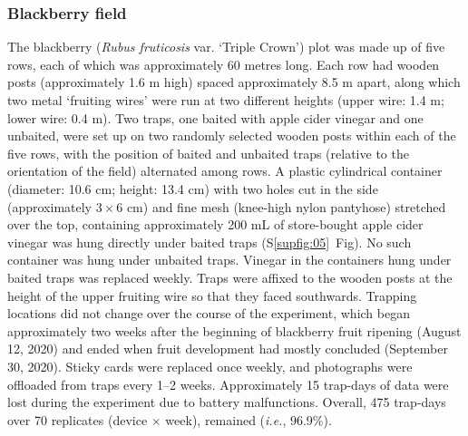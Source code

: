 \documentclass[12pt]{article}
\begin{document}
\begin{linenumbers}
		\subsubsection*{Blackberry field}
		The blackberry (\emph{Rubus fruticosis} var. ‘Triple Crown’) plot was made up of five rows, each of which was approximately 60 metres long. Each row had wooden posts (approximately 1.6 m high) spaced approximately 8.5 m apart, along which two metal ‘fruiting wires’ were run at two different heights (upper wire: 1.4 m; lower wire: 0.4 m). Two traps, one baited with apple cider vinegar and one unbaited, were set up on two randomly selected wooden posts within each of the five rows, with the position of baited and unbaited traps (relative to the orientation of the field) alternated among rows. A plastic cylindrical container (diameter: 10.6 cm; height: 13.4 cm) with two holes cut in the side (approximately $3 \times{} 6$ cm) and fine mesh (knee-high nylon pantyhose) stretched over the top, containing approximately 200 mL of store-bought apple cider vinegar was hung directly under baited traps
		(S\ref{supfig:05}~Fig). No such container was hung under unbaited traps. Vinegar in the containers hung under baited traps was replaced weekly. Traps were affixed to the wooden posts at the height of the upper fruiting wire so that they faced southwards. Trapping locations did not change over the course of the experiment, which began approximately two weeks after the beginning of blackberry fruit ripening (August 12, 2020) and ended when fruit development had mostly concluded (September 30, 2020). Sticky cards were replaced once weekly, and photographs were offloaded from traps every 1–2 weeks. Approximately 15 trap-days of data were lost during the experiment due to battery malfunctions. Overall, 475 trap-days over 70 replicates (device $\times{}$ week), remained (\emph{i.e.}, 96.9\%).
		

\end{linenumbers}
\end{document}

